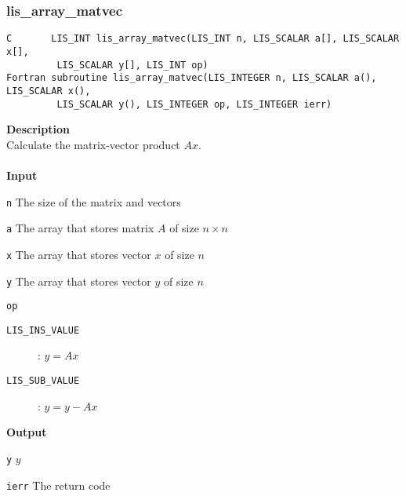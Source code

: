 \documentclass[a4paper]{article}
\newcommand{\namelistlabel}[1]{\mbox{#1}\hfill}
\newenvironment{namelist}[1]{%
\begin{list}{}
  {\let\makelabel\namelistlabel
  \settowidth{\labelwidth}{#1}
  \setlength{\leftmargin}{1.1\labelwidth}}
  }{%
\end{list}}
\begin{document}
\newpage
\subsubsection{lis\_array\_matvec}
\begin{screen}
\verb|C       LIS_INT lis_array_matvec(LIS_INT n, LIS_SCALAR a[], LIS_SCALAR x[],|\\
\verb|         LIS_SCALAR y[], LIS_INT op)|\\
\verb|Fortran subroutine lis_array_matvec(LIS_INTEGER n, LIS_SCALAR a(), LIS_SCALAR x(),|\\
\verb|         LIS_SCALAR y(), LIS_INTEGER op, LIS_INTEGER ierr)|
\end{screen}
{\bf Description}\\
\indent
Calculate the matrix-vector product $Ax$.
\\ \\
\noindent
{\bf Input}
\begin{namelist}{XXXXXXXXXXXXXXXXXXXX}
\item[\tt n] The size of the matrix and vectors  
\item[\tt a] The array that stores matrix $A$ of size $n \times n$
\item[\tt x] The array that stores vector $x$ of size $n$
\item[\tt y] The array that stores vector $y$ of size $n$
\item[\tt op] \begin{description}
\item[\tt LIS\_INS\_VALUE]: $y = Ax$
\item[\tt LIS\_SUB\_VALUE]: $y = y - Ax$
\end{description}
\end{namelist}
{\bf Output}
\begin{namelist}{XXXXXXXXXXXXXXXXXXXX}
\item[\tt y] $y$
\item[\tt ierr] The return code
\end{namelist}
\end{document}

